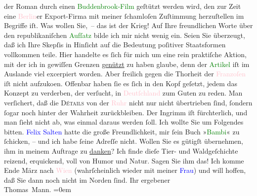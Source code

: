                     der Roman durch einen \textcolor{green}{Buddenbrook-Film}{}\ledrightnote{\textcolor{green}{Die Buddenbrooks}}
                    geſtützt werden wird, den zur Zeit eine \textcolor{pink}{Berlin}{}\ledrightnote{\textcolor{pink}{Berlin}}er Export-Firma mit meiner ſchamloſen Zuſtimmung {\pb}herzuſtellen im Begriffe iſt. Was
                    wollen Sie, – das ist der Krieg!\pend
           \pstart
           Auf Ihre freundlichen Worte über den republikaniſchen \textcolor{green}{Aufſatz}{} bilde ich mir nicht wenig ein.
                    Seien Sie überzeugt, daß ich Ihre Skepſis in Hinſicht auf die Bedeutung
                    poſitiver Staatsformen vollkommen teile. Hier handelte es ſich für mich um eine
                    rein praktiſche Aktion, mit der ich in gewiſſen Grenzen \uline{genützt} zu haben glaube, denn der \textcolor{green}{Artikel}{} iſt im Auslande viel excerpiert worden. Aber
                    freilich gegen die Thorheit der \textcolor{pink}{Franzoſen}{}\ledrightnote{\textcolor{pink}{Frankreich}} iſt
                    nicht aufzuko{\geminationm}en. Offenbar haben ſie es ſich in den
                    Kopf geſetzt, jedem das Konzept zu verderben, der verſucht, in \textcolor{pink}{Deutſchland}{}\ledrightnote{\textcolor{pink}{Deutschland}} zum Guten zu reden. Man verſichert, daß die
                        \textsc{Détails} von der \textcolor{pink}{Ruhr}{}\ledrightnote{\textcolor{pink}{Ruhrgebiet}} nicht nur nicht übertrieben ſind, ſon{\pb}dern ſogar noch hinter der Wahrheit
                    zurückbleiben. Der Ingrimm iſt fürchterlich, und man ſieht nicht ab, was einmal
                    daraus werden ſoll.\pend
           \pstart
           Ich wollte Sie um Folgendes bitten. \textcolor{blue}{Felix
                        Salten}{}\ledrightnote{\textcolor{blue}{Felix Salten}} hatte die große Freundlichkeit, mir ſein Buch »\textcolor{green}{Bambi}{}\ledrightnote{\textcolor{green}{Bambi}}« zu ſchicken, – und ich habe ſeine Adreſſe nicht.
                    Wollen Sie es gütigſt übernehmen, ihm in meinem Auftrage zu \uline{danken}? Ich finde dieſe Tier- und Waldgeſchichte reizend,
                    erquickend, voll von Humor und Natur. Sagen Sie ihm das!\pend
           \pstart
           Ich komme Ende März nach \textcolor{pink}{Wien}{}\ledrightnote{\textcolor{pink}{Wien}} (wahrſcheinlich
                    wieder mit meiner \textcolor{blue}{Frau}{})
                    und will hoffen, daß Sie dann noch nicht im Norden ſind.\pend
           \pstart
           Ihr ergebener{\\[\baselineskip]}\spacefill\mbox{Thomas Mann.}\pend
           \leftskip=0em{}\endnumbering{}  
      